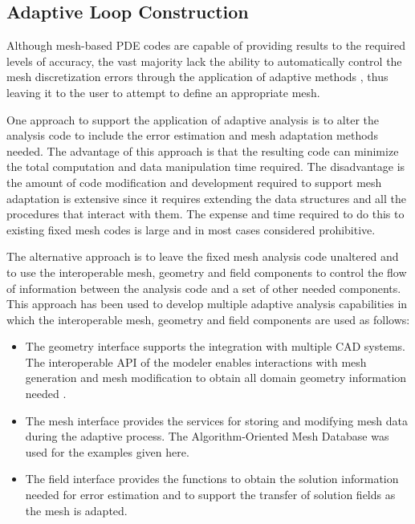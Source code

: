 \subsection{Adaptive Loop Construction}

Although mesh-based PDE 
codes are capable of providing results to the required levels of
accuracy, the vast majority lack the ability to automatically control
the mesh discretization errors through the application of adaptive
methods \cite{AiOd00,BaSt01,BaRa03}, thus leaving it to the user to
attempt to define an appropriate mesh.

One approach to support the application of adaptive analysis is to
alter the analysis code to include the error estimation and mesh
adaptation methods needed. The advantage of this approach is that the
resulting code can minimize the total computation and data
manipulation time required. The disadvantage is the amount of code
modification and development required to support mesh adaptation
is extensive since it requires extending the data structures
and all the procedures that interact with them. The expense and time
required to do this to existing fixed mesh codes is large and in most
cases considered prohibitive.

The alternative approach is to leave the fixed mesh analysis code
unaltered and to use the interoperable mesh, geometry and field
components to control the flow of information between the analysis
code and a set of other needed components. This approach has been used
to develop multiple adaptive analysis capabilities in which the
interoperable mesh, geometry and field components are used as follows:

\begin{itemize}
\item The geometry interface supports the integration with multiple
CAD systems. The interoperable API of the modeler enables interactions
with mesh generation and mesh modification to obtain all domain
geometry information needed \cite{BeWa04}.

\item The mesh interface provides the services for storing and
modifying mesh data during the adaptive process. The
Algorithm-Oriented Mesh Database \cite{ReSh03} was used for the examples given
here.

\item The field interface \cite{BeSh99} provides the functions to obtain
the solution information needed for error estimation and to support
the transfer of solution fields as the mesh is adapted.
\end{itemize}

